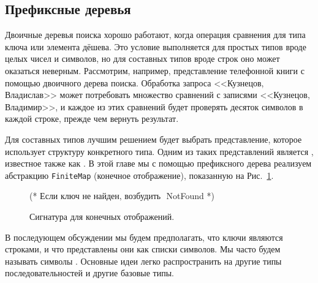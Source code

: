 \subsection{Префиксные деревья}
\label{sc:10.3.1}

Двоичные деревья поиска хорошо работают, когда операция сравнения для
типа ключа или элемента дёшева. Это условие выполняется для простых
типов вроде целых чисел и символов, но для составных типов вроде строк оно
может оказаться неверным. Рассмотрим, например, представление
телефонной книги с помощью двоичного дерева поиска. Обработка запроса
<<Кузнецов, Владислав>> может потребовать множество сравнений с
записями <<Кузнецов, Владимир>>, и каждое из этих сравнений будет
проверять десяток символов в каждой строке, прежде чем вернуть
результат.

Для составных типов лучшим решением будет выбрать представление,
которое использует структуру конкретного типа. Одним из таких
представлений является , известное также
как . В этой главе
мы с помощью префиксного дерева реализуем абстракцию
\lstinline!FiniteMap! (конечное отображение), показанную на Рис.~\ref{fig:10.9}.

\begin{figure}
  \centering

  (* $\mbox{Если ключ не найден, возбудить }$ NotFound *)
  \caption{Сигнатура для конечных отображений.}
  \label{fig:10.9}
\end{figure}

В последующем обсуждении мы будем предполагать, что ключи являются
строками, и что представлены они как списки символов. Мы часто будем
называть символы . Основные идеи легко
распространить на другие типы последовательностей и другие базовые
типы.

